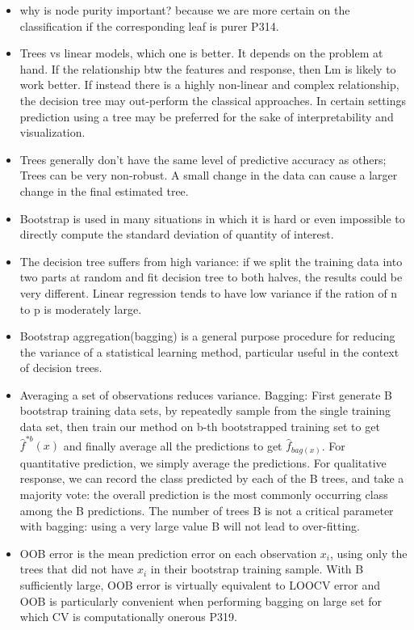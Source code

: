 \documentclass[a4paper, 12pt]{article}
\begin{document}
\begin{itemize}
	\item why is node purity important? because we are more certain on the classification if the corresponding leaf is purer P314.
	\item Trees vs linear models, which one is better. It depends on the problem at hand. If the relationship btw the features and response, then Lm is likely to work better. If instead there is a highly non-linear and complex relationship, the decision tree may out-perform the classical approaches. In certain settings prediction using a tree may be preferred for the sake of interpretability and visualization.
	\item Trees generally don't have the same level of predictive accuracy as others; Trees can be very non-robust. A small change in the data can cause a larger change in the final estimated tree.
	\item Bootstrap is used in many situations in which it is hard or even impossible to directly compute the standard deviation of quantity of interest.
	\item The decision tree suffers from high variance: if we split the training data into two parts at random and fit decision tree to both halves, the results could be very different. Linear regression tends to have low variance if the ration of n to p is moderately large. 
	\item Bootstrap aggregation(bagging) is a general purpose procedure for reducing the variance of a statistical learning method, particular useful in the context of decision trees.
	\item Averaging a set of observations reduces variance. Bagging: First generate B bootstrap training data sets, by repeatedly sample from the single training data set, then train our method on b-th bootstrapped training set to get $\hat{f}^{*b}(x)$ and finally average all the predictions to get $\hat{f}_{bag(x)}$. For quantitative prediction, we simply average the predictions. For qualitative response, we can record the class predicted by each of the B trees, and take a majority vote: the overall prediction is the most commonly occurring class among the B predictions. The number of trees B is not a critical parameter with bagging: using a very large value B will not lead to over-fitting.
	\item  OOB error is the mean prediction error on each observation $x_i$, using only the trees that did not have $x_i$ in their bootstrap training sample. With B sufficiently large, OOB error is virtually equivalent to LOOCV error and OOB is particularly convenient when performing bagging on large set for which CV is computationally onerous P319.

\end{itemize}
\end{document}

